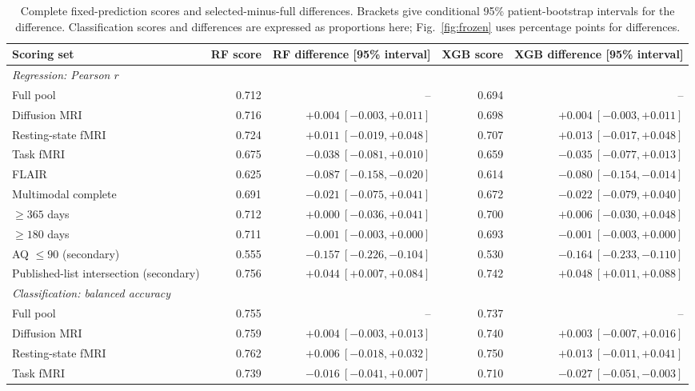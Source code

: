 \begin{table}[!t]
\caption{Complete fixed-prediction scores and selected-minus-full differences. Brackets give conditional 95\% patient-bootstrap intervals for the difference. Classification scores and differences are expressed as proportions here; Fig.~\ref{fig:frozen} uses percentage points for differences.}
\label{tab:frozen-complete}
\centering\footnotesize
\setlength{\tabcolsep}{4pt}
\begin{tabular}{lrrrr}
\toprule
\textbf{Scoring set} & \textbf{RF score} & \textbf{RF difference [95\% interval]} & \textbf{XGB score} & \textbf{XGB difference [95\% interval]} \\
\midrule
\multicolumn{5}{l}{\emph{Regression: Pearson $r$}} \\
Full pool & 0.712 & -- & 0.694 & -- \\
Diffusion MRI & 0.716 & $+0.004\ [-0.003,+0.011]$ & 0.698 & $+0.004\ [-0.003,+0.011]$ \\
Resting-state fMRI & 0.724 & $+0.011\ [-0.019,+0.048]$ & 0.707 & $+0.013\ [-0.017,+0.048]$ \\
Task fMRI & 0.675 & $-0.038\ [-0.081,+0.010]$ & 0.659 & $-0.035\ [-0.077,+0.013]$ \\
FLAIR & 0.625 & $-0.087\ [-0.158,-0.020]$ & 0.614 & $-0.080\ [-0.154,-0.014]$ \\
Multimodal complete & 0.691 & $-0.021\ [-0.075,+0.041]$ & 0.672 & $-0.022\ [-0.079,+0.040]$ \\
$\ge365$ days & 0.712 & $+0.000\ [-0.036,+0.041]$ & 0.700 & $+0.006\ [-0.030,+0.048]$ \\
$\ge180$ days & 0.711 & $-0.001\ [-0.003,+0.000]$ & 0.693 & $-0.001\ [-0.003,+0.000]$ \\
AQ $\le90$ (secondary) & 0.555 & $-0.157\ [-0.226,-0.104]$ & 0.530 & $-0.164\ [-0.233,-0.110]$ \\
Published-list intersection (secondary) & 0.756 & $+0.044\ [+0.007,+0.084]$ & 0.742 & $+0.048\ [+0.011,+0.088]$ \\
\midrule
\multicolumn{5}{l}{\emph{Classification: balanced accuracy}} \\
Full pool & 0.755 & -- & 0.737 & -- \\
Diffusion MRI & 0.759 & $+0.004\ [-0.003,+0.013]$ & 0.740 & $+0.003\ [-0.007,+0.016]$ \\
Resting-state fMRI & 0.762 & $+0.006\ [-0.018,+0.032]$ & 0.750 & $+0.013\ [-0.011,+0.041]$ \\
Task fMRI & 0.739 & $-0.016\ [-0.041,+0.007]$ & 0.710 & $-0.027\ [-0.051,-0.003]$ \\

\end{tabular}
\end{table}

